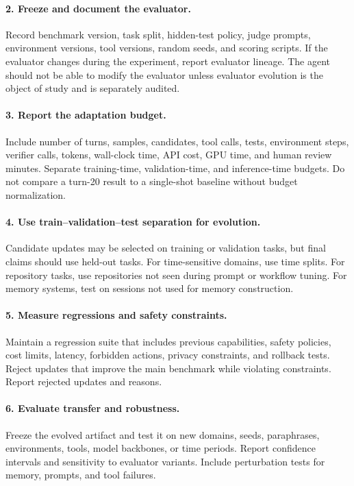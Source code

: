 \paragraph{2. Freeze and document the evaluator.}
Record benchmark version, task split, hidden-test policy, judge prompts, environment versions, tool versions, random seeds, and scoring scripts. If the evaluator changes during the experiment, report evaluator lineage. The agent should not be able to modify the evaluator unless evaluator evolution is the object of study and is separately audited.

\paragraph{3. Report the adaptation budget.}
Include number of turns, samples, candidates, tool calls, tests, environment steps, verifier calls, tokens, wall-clock time, API cost, GPU time, and human review minutes. Separate training-time, validation-time, and inference-time budgets. Do not compare a turn-20 result to a single-shot baseline without budget normalization.

\paragraph{4. Use train--validation--test separation for evolution.}
Candidate updates may be selected on training or validation tasks, but final claims should use held-out tasks. For time-sensitive domains, use time splits. For repository tasks, use repositories not seen during prompt or workflow tuning. For memory systems, test on sessions not used for memory construction.

\paragraph{5. Measure regressions and safety constraints.}
Maintain a regression suite that includes previous capabilities, safety policies, cost limits, latency, forbidden actions, privacy constraints, and rollback tests. Reject updates that improve the main benchmark while violating constraints. Report rejected updates and reasons.

\paragraph{6. Evaluate transfer and robustness.}
Freeze the evolved artifact and test it on new domains, seeds, paraphrases, environments, tools, model backbones, or time periods. Report confidence intervals and sensitivity to evaluator variants. Include perturbation tests for memory, prompts, and tool failures.

